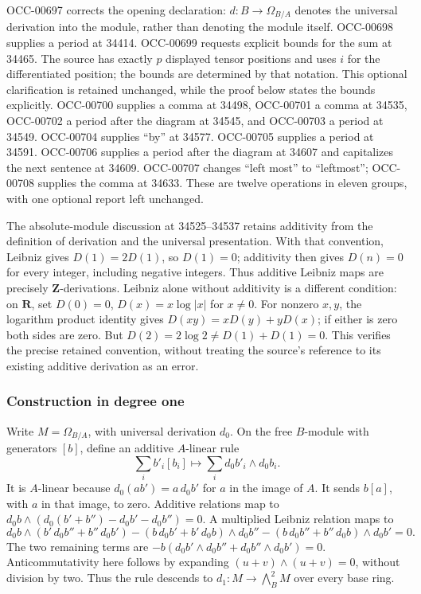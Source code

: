 OCC-00697 corrects the opening declaration: \(d:B\to\Omega_{B/A}\) denotes the universal derivation into the module, rather than denoting the module itself. OCC-00698 supplies a period at 34414. OCC-00699 requests explicit bounds for the sum at 34465. The source has exactly \(p\) displayed tensor positions and uses \(i\) for the differentiated position; the bounds are determined by that notation. This optional clarification is retained unchanged, while the proof below states the bounds explicitly. OCC-00700 supplies a comma at 34498, OCC-00701 a comma at 34535, OCC-00702 a period after the diagram at 34545, and OCC-00703 a period at 34549. OCC-00704 supplies ``by'' at 34577. OCC-00705 supplies a period at 34591. OCC-00706 supplies a period after the diagram at 34607 and capitalizes the next sentence at 34609. OCC-00707 changes ``left most'' to ``leftmost''; OCC-00708 supplies the comma at 34633. These are twelve operations in eleven groups, with one optional report left unchanged.

The absolute-module discussion at 34525--34537 retains additivity from the definition of derivation and the universal presentation. With that convention, Leibniz gives \(D(1)=2D(1)\), so \(D(1)=0\); additivity then gives \(D(n)=0\) for every integer, including negative integers. Thus additive Leibniz maps are precisely \(\mathbf Z\)-derivations. Leibniz alone without additivity is a different condition: on \(\mathbf R\), set \(D(0)=0\), \(D(x)=x\log|x|\) for \(x\ne0\). For nonzero \(x,y\), the logarithm product identity gives \(D(xy)=xD(y)+yD(x)\); if either is zero both sides are zero. But \(D(2)=2\log2\ne D(1)+D(1)=0\). This verifies the precise retained convention, without treating the source's reference to its existing additive derivation as an error.

\subsubsection{Construction in degree one}\label{algebra-proof-042-construction-in-degree-one}

Write \(M=\Omega_{B/A}\), with universal derivation \(d_0\). On the free \(B\)-module with generators \([b]\), define an additive \(A\)-linear rule \[
\sum_i b'_i[b_i]\longmapsto\sum_i d_0b'_i\wedge d_0b_i.
\] It is \(A\)-linear because \(d_0(ab')=a\,d_0b'\) for \(a\) in the image of \(A\). It sends \(b[a]\), with \(a\) in that image, to zero. Additive relations map to \(d_0b\wedge(d_0(b'+b'')-d_0b'-d_0b'')=0\). A multiplied Leibniz relation maps to \[
d_0b\wedge(b'\,d_0b''+b''\,d_0b')
-(b\,d_0b'+b'\,d_0b)\wedge d_0b''
-(b\,d_0b''+b''\,d_0b)\wedge d_0b'=0.
\] The two remaining terms are \(-b(d_0b'\wedge d_0b''+d_0b''\wedge d_0b')=0\). Anticommutativity here follows by expanding \((u+v)\wedge(u+v)=0\), without division by two. Thus the rule descends to \(d_1:M\to\bigwedge_B^2M\) over every base ring.

